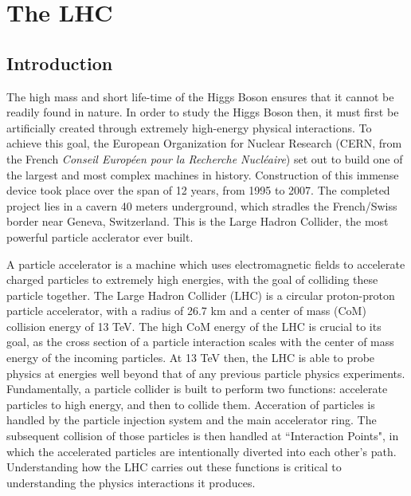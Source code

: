 \chapter{The LHC}\label{chapter:lhc}

\section{Introduction}
    The high mass and short life-time of the Higgs Boson ensures that it cannot be readily found in nature.
    In order to study the Higgs Boson then, it must first be artificially created through extremely high-energy physical interactions.
    To achieve this goal, the European Organization for Nuclear Research
        (CERN, from the French \textit{Conseil Européen pour la Recherche Nucléaire})
        set out to build one of the largest and most complex machines in history.
    Construction of this immense device took place over the span of 12 years, from 1995 to 2007.
    The completed project lies in a cavern 40 meters underground, which stradles the French/Swiss border near Geneva, Switzerland.
    This is the Large Hadron Collider, the most powerful particle acclerator ever built.

    A particle accelerator is a machine which uses electromagnetic fields to accelerate charged particles to extremely high energies, with the goal of colliding these particle together.
    The Large Hadron Collider (LHC) is a circular proton-proton particle accelerator, with a radius of 26.7 km and a center of mass (CoM) collision energy of 13 TeV.
    The high CoM energy of the LHC is crucial to its goal, as the cross section of a particle interaction scales with the center of mass energy of the incoming particles.
    At 13 TeV then, the LHC is able to probe physics at energies well beyond that of any previous particle physics experiments.
    Fundamentally, a particle collider is built to perform two functions: accelerate particles to high energy, and then to collide them.
    Acceration of particles is handled by the particle injection system and the main accelerator ring.
    The subsequent collision of those particles is then handled at ``Interaction Points", in which the accelerated particles are intentionally diverted into each other's path.
    Understanding how the LHC carries out these functions is critical to understanding the physics interactions it produces.


